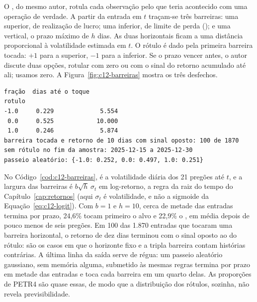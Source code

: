 O , do mesmo autor, rotula cada observação pelo que teria acontecido com uma operação de verdade. A partir da entrada em $t$ traçam-se três barreiras: uma superior, de realização de lucro; uma inferior, de limite de perda (); e uma vertical, o prazo máximo de $h$ dias. As duas horizontais ficam a uma distância proporcional à volatilidade estimada em $t$. O rótulo é dado pela primeira barreira tocada: $+1$ para a superior, $-1$ para a inferior. Se o prazo vencer antes, o autor discute duas opções, rotular com zero ou com o sinal do retorno acumulado até ali; usamos zero. A Figura~\ref{fig:c12-barreiras} mostra os três desfechos.


\begin{lstlisting}[style=saida]
        fração  dias até o toque
rotulo                          
-1.0     0.229             5.554
 0.0     0.525            10.000
 1.0     0.246             5.874
barreira tocada e retorno de 10 dias com sinal oposto: 100 de 1870
sem rótulo no fim da amostra: 2025-12-15 a 2025-12-30
passeio aleatório: {-1.0: 0.252, 0.0: 0.497, 1.0: 0.251}
\end{lstlisting}


No Código~\ref{cod:c12-barreiras},  é a volatilidade diária dos 21 pregões até $t$, e a largura das barreiras é $b\sqrt{h}\,\sigma_t$ em log-retorno, a regra da raiz do tempo do Capítulo~\ref{cap:retornos} (aqui $\sigma_t$ é volatilidade, e não a sigmoide da Equação~\eqref{eq:c12-logit}). Com $b = 1$ e $h = 10$, cerca de metade das entradas termina por prazo, 24,6\% tocam primeiro o alvo e 22,9\% o , em média depois de pouco menos de seis pregões. Em 100 das 1.870 entradas que tocaram uma barreira horizontal, o retorno de dez dias terminou com o sinal oposto ao do rótulo: são os casos em que o horizonte fixo e a tripla barreira contam histórias contrárias. A última linha da saída serve de régua: um passeio aleatório gaussiano, sem memória alguma, submetido às mesmas regras termina por prazo em metade das entradas e toca cada barreira em um quarto delas. As proporções de PETR4 são quase essas, de modo que a distribuição dos rótulos, sozinha, não revela previsibilidade.

